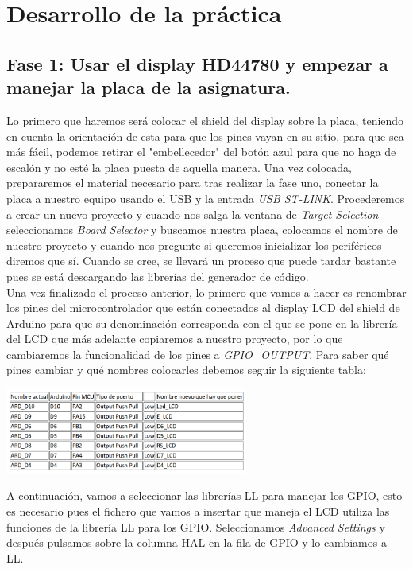 \documentclass[11pt,a4paper]{article}
\begin{document}
	\section{Desarrollo de la práctica}
	\subsection{Fase 1: Usar el display HD44780 y empezar a manejar la placa de la asignatura.}
	Lo primero que haremos será colocar el shield del display sobre la placa, teniendo en cuenta la orientación de esta para que los pines vayan en su sitio, para que sea más fácil, podemos retirar el "embellecedor" del botón azul para que no haga de escalón y no esté la placa puesta de aquella manera. Una vez colocada, prepararemos el material necesario para tras realizar la fase uno, conectar la placa a nuestro equipo usando el USB y la entrada \textit{USB ST-LINK}. Procederemos a crear un nuevo proyecto y cuando nos salga la ventana de \textit{Target Selection} seleccionamos \textit{Board Selector} y buscamos nuestra placa, colocamos el nombre de nuestro proyecto y cuando nos pregunte si queremos inicializar los periféricos diremos que sí. Cuando se cree, se llevará un proceso que puede tardar bastante pues se está descargando las librerías del generador de código.\\
	
	Una vez finalizado el proceso anterior, lo primero que vamos a hacer es renombrar los pines del microcontrolador que están conectados al display LCD del shield de Arduino para que su denominación corresponda con el que se pone en la librería del LCD que más adelante copiaremos a nuestro proyecto, por lo que cambiaremos la funcionalidad de los pines a \textit{GPIO\_OUTPUT}. Para saber qué pines cambiar y qué nombres colocarles debemos seguir la siguiente tabla:
	\begin{center}
		\includegraphics[width=0.6\textwidth]{tablapines.png}
	\end{center}
	
	A continuación, vamos a seleccionar las librerías LL para manejar los GPIO, esto es
	necesario pues el fichero que vamos a insertar que maneja el LCD utiliza las funciones de la librería LL para los GPIO. Seleccionamos \textit{Advanced Settings} y después pulsamos sobre la columna HAL en la fila de GPIO y lo cambiamos a LL.\\
	
\end{document}
